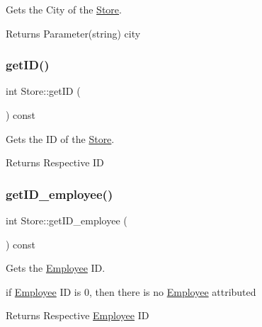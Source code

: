 Gets the City of the \hyperlink{class_store}{Store}. 

\begin{DoxyReturn}{Returns}
Parameter(string) city 
\end{DoxyReturn}
\mbox{\label{class_store_aaaf0609bbd37babf36a4b9afb09709cf}} 
\subsubsection{\texorpdfstring{get\+I\+D()}{getID()}}
{\footnotesize\ttfamily int Store\+::get\+ID (\begin{DoxyParamCaption}{ }\end{DoxyParamCaption}) const}



Gets the ID of the \hyperlink{class_store}{Store}. 

\begin{DoxyReturn}{Returns}
Respective ID 
\end{DoxyReturn}
\mbox{\label{class_store_a6b828ab56ffdcf4c8eb64e53ab998543}} 
\subsubsection{\texorpdfstring{get\+I\+D\+\_\+employee()}{getID\_employee()}}
{\footnotesize\ttfamily int Store\+::get\+I\+D\+\_\+employee (\begin{DoxyParamCaption}{ }\end{DoxyParamCaption}) const}



Gets the \hyperlink{class_employee}{Employee} ID. 

if \hyperlink{class_employee}{Employee} ID is 0, then there is no \hyperlink{class_employee}{Employee} attributed

\begin{DoxyReturn}{Returns}
Respective \hyperlink{class_employee}{Employee} ID 
\end{DoxyReturn}
\mbox{\label{class_store_afbef10a37143ea91b200d50e8e6b83d7}} 
